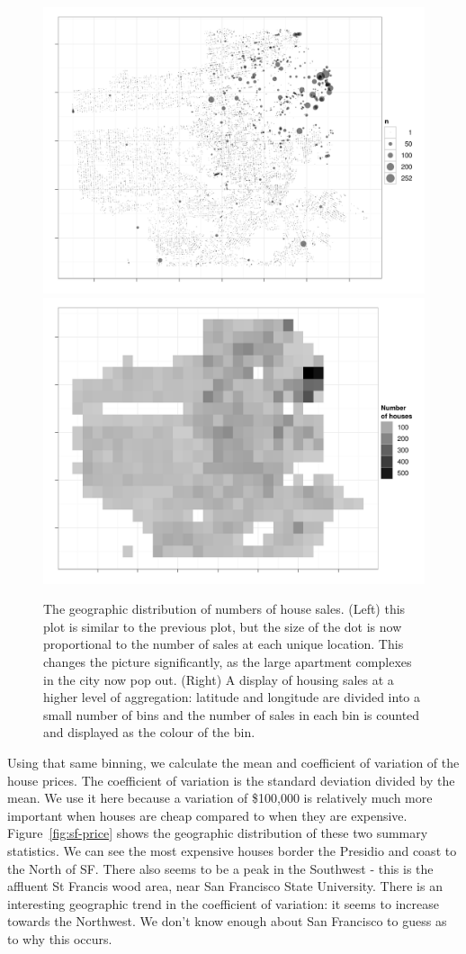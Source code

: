 \documentclass[oneside]{article}
\begin{document}
\begin{figure}[htbp]
  \centering
    \includegraphics[width=0.5\linewidth]{sf-geo-n}%
    \includegraphics[width=0.5\linewidth]{sf-bin-n}
  \caption{The geographic distribution of numbers of house sales.  (Left) this plot is similar to the previous plot, but the size of the dot is now proportional to the number of sales at each unique location.  This changes the picture significantly, as the large apartment complexes in the city now pop out.  (Right) A display of housing sales at a higher level of aggregation: latitude and longitude are divided into a small number of bins and the number of sales in each bin is counted and displayed as the colour of the bin.}
  \label{fig:sf-n}
\end{figure}

Using that same binning, we calculate the mean and coefficient of variation of the house prices.  The coefficient of variation is the standard deviation divided by the mean.  We use it here because a variation of \$100,000 is relatively much more important when houses are cheap compared to when they are expensive.  Figure~\ref{fig:sf-price} shows the geographic distribution of these two summary statistics.   We can see the most expensive houses border the Presidio and coast to the North of SF.  There also seems to be a peak in the Southwest - this is the affluent St Francis wood area, near San Francisco State University.  There is an interesting geographic trend in the coefficient of variation: it seems to increase towards the Northwest.  We don't know enough about San Francisco to guess as to why this occurs.
\end{document}
